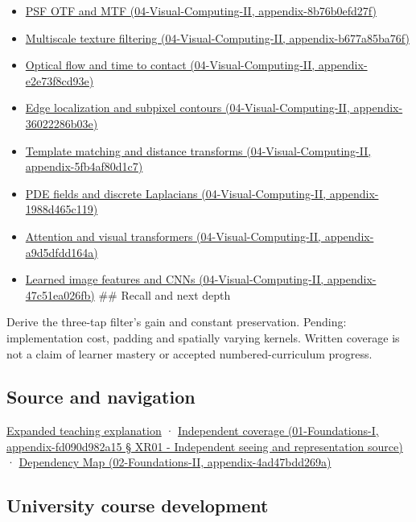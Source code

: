 \begin{itemize}
\item
  \href{}{PSF OTF and MTF (04-Visual-Computing-II, appendix-8b76b0efd27f)}
\item
  \href{}{Multiscale texture filtering (04-Visual-Computing-II, appendix-b677a85ba76f)}
\item
  \href{}{Optical flow and time to contact (04-Visual-Computing-II, appendix-e2e73f8cd93e)}
\item
  \href{}{Edge localization and subpixel contours (04-Visual-Computing-II, appendix-36022286b03e)}
\item
  \href{}{Template matching and distance transforms (04-Visual-Computing-II, appendix-5fb4af80d1c7)}
\item
  \href{}{PDE fields and discrete Laplacians (04-Visual-Computing-II, appendix-1988d465c119)}
\item
  \href{}{Attention and visual transformers (04-Visual-Computing-II, appendix-a9d5dfdd164a)}
\item
  \href{}{Learned image features and CNNs (04-Visual-Computing-II, appendix-47c51ea026fb)} \#\# Recall and next depth
\end{itemize}

Derive the three-tap filter's gain and constant preservation. Pending: implementation cost, padding and spatially varying kernels. Written coverage is not a claim of learner mastery or accepted numbered-curriculum progress.

\subsection{Source and navigation}\label{source-and-navigation}

\href{Continuous\%20Notes/University\%20-\%20Worlds,\%20Images\%20and\%20Inference\%20-\%20Graphics,\%20Vision\%20and\%20Photography\#A\%20footprint\%20is\%20more\%20meaningful\%20than\%20an\%20isolated\%20pixel\%20center}{Expanded teaching explanation} · \href{}{Independent coverage (01-Foundations-I, appendix-fd090d982a15 § XR01 - Independent seeing and representation source)} · \href{}{Dependency Map (02-Foundations-II, appendix-4ad47bdd269a)}

\subsection{University course development}\label{university-course-development}

